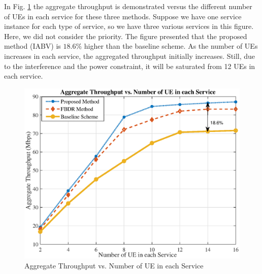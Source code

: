 \documentclass[conference]{IEEEtran}
\begin{document}
In Fig. \ref{fig:1} the aggregate throughput is demonstrated versus the different number of UEs in each service for these three methods. Suppose we have one service instance for each type of service, so we have three various services in this figure.
Here, we did not consider the priority. The figure presented that the proposed method (IABV) is $18.6\%$ higher than the baseline scheme.
As the number of UEs increases in each service, the aggregated throughput initially increases. Still, due to the interference and the power constraint, it will be saturated from 12 UEs in each service.
\begin{figure}
  \centering 
    \includegraphics[scale = 0.47]{rate_ue1.eps}
  \caption{Aggregate Throughput vs. Number of UE in each Service }
  \label{fig:1}
\end{figure}
\end{document}
